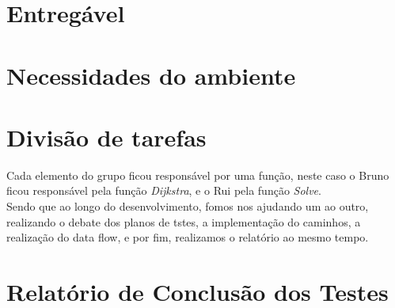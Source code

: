 \documentclass{article}
\begin{document}
\section{Entregável}

\section{Necessidades do ambiente}



\section{Divisão de tarefas}

\quad Cada elemento do grupo ficou responsável por uma função, neste caso o Bruno ficou responsável pela função \textit{Dijkstra}, e o Rui pela função \textit{Solve}.\\

Sendo que ao longo do desenvolvimento, fomos nos ajudando um ao outro, realizando o debate dos planos de tstes, a implementação do caminhos, a realização do data flow, e por fim, realizamos o relatório ao mesmo tempo. 

\section{Relatório de Conclusão dos Testes}
\end{document}
